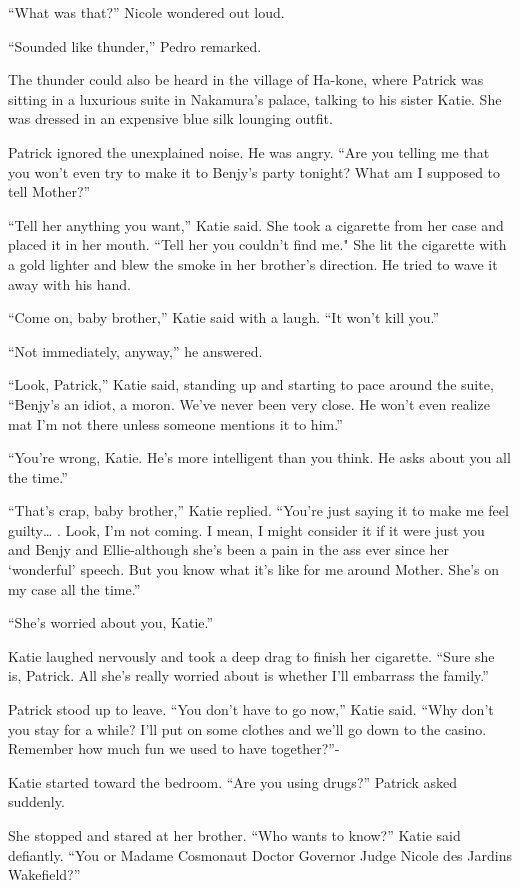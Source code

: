 \documentclass[]{article}
\begin{document}
{“What was that?” Nicole wondered out loud.

“Sounded like thunder,” Pedro remarked.

The thunder could also be heard in the village of Ha-kone, where Patrick was sitting in a luxurious suite in Nakamura’s palace, talking to his sister Katie.  She was dressed in an expensive blue silk lounging outfit.

Patrick ignored the unexplained noise.  He was angry.  “Are you telling me that you won’t even try to make it to Benjy’s party tonight? What am I supposed to tell Mother?”

“Tell her anything you want,” Katie said.  She took a cigarette from her case and placed it in her mouth.  “Tell her you couldn’t find me."  She lit the cigarette with a gold lighter and blew the smoke in her brother’s direction.  He tried to wave it away with his hand.

“Come on, baby brother,” Katie said with a laugh.  “It won’t kill you.”

“Not immediately, anyway,” he answered.

“Look, Patrick,” Katie said, standing up and starting to pace around the suite, “Benjy’s an idiot, a moron.  We’ve never been very close.  He won’t even realize mat I’m not there unless someone mentions it to him.”

“You’re wrong, Katie.  He’s more intelligent than you think.  He asks about you all the time.”

“That’s crap, baby brother,” Katie replied.  “You’re just saying it to make me feel guilty… .  Look, I’m not coming.  I mean, I might consider it if it were just you and Benjy and Ellie-although she’s been a pain in the ass ever since her ‘wonderful’ speech.  But you know what it’s like for me around Mother.  She’s on my case all the time.”

“She’s worried about you, Katie.”

Katie laughed nervously and took a deep drag to finish her cigarette.  “Sure she is, Patrick.  All she’s really worried about is whether I’ll embarrass the family.”

Patrick stood up to leave.  “You don’t have to go now,” Katie said.  “Why don’t you stay for a while? I’ll put on some clothes and we’ll go down to the casino.  Remember how much fun we used to have together?”-

Katie started toward the bedroom.  “Are you using drugs?” Patrick asked suddenly.

She stopped and stared at her brother.  “Who wants to know?” Katie said defiantly.  “You or Madame Cosmonaut Doctor Governor Judge Nicole des Jardins Wakefield?”

}
\end{document}
